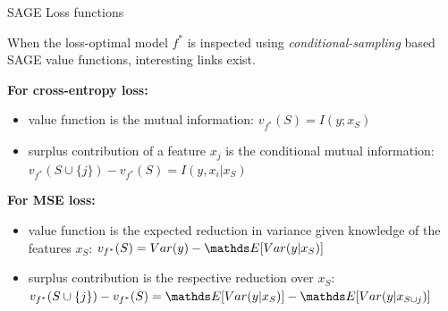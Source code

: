 \documentclass[10pt,compress,t,notes=noshow, xcolor=table]{beamer}
\begin{document}
\begin{frame}{SAGE Loss functions}

When the loss-optimal model $f^*$ is inspected using \textit{conditional-sampling} based SAGE value functions, interesting links exist.

\lz\pause
\textbf{For cross-entropy loss:} 
  \begin{itemize}
      \item value function is the mutual information:  $v_{f^*}(S) = I(y;x_S)$
      \item surplus contribution of a feature $x_j$ is the conditional mutual information: $v_{f^*}(S \cup \{j\}) - v_{f^*}(S) = I(y,x_i|x_S)$
  \end{itemize}

\lz\pause

\textbf{For MSE loss:} 
    \begin{itemize}
    \item value function is the expected reduction in variance given knowledge of the features $x_S$: $v_{f^*}(S) = Var(y) - \E[Var(y|x_S)]$
    \item surplus contribution is the respective reduction over $x_S$:
    $v_{f^*}(S \cup \{j\}) - v_{f^*}(S) = \E[Var(y|x_S)] - \E[Var(y|x_{S \cup {j}})]$
    \end{itemize}
    
\end{frame}
\end{document}
